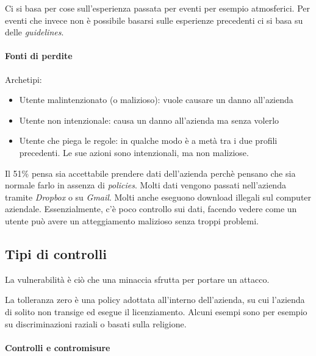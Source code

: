 
Ci si basa per cose sull'esperienza passata per eventi per esempio atmosferici.
Per eventi che invece non è possibile basarsi sulle esperienze precedenti ci si
basa su delle \textit{guidelines}.

\paragraph*{Fonti di perdite}

Archetipi:
\begin{itemize}
\item Utente malintenzionato (o malizioso): vuole causare un danno all'azienda
\item Utente non intenzionale: causa un danno all'azienda ma senza volerlo
\item Utente che piega le regole: in qualche modo è a metà tra i due profili
precedenti. Le sue azioni sono intenzionali, ma non maliziose.
\end{itemize}

Il 51\% pensa sia accettabile prendere dati dell'azienda perchè pensano che sia
normale farlo in assenza di \textit{policies}. Molti dati vengono passati
nell'azienda tramite \textit{Dropbox} o su \textit{Gmail}. Molti anche eseguono
download illegali sul computer aziendale. Essenzialmente, c'è poco controllo sui
dati, facendo vedere come un utente può avere un atteggiamento malizioso senza
troppi problemi.


\subsection{Tipi di controlli}


La vulnerabilità è ciò che una minaccia sfrutta per portare un attacco.


La tolleranza zero è una policy adottata all'interno dell'azienda, su cui
l'azienda di solito non transige ed esegue il licenziamento. Alcuni esempi sono
per esempio su discriminazioni raziali o basati sulla religione.


\paragraph*{Controlli e contromisure}

